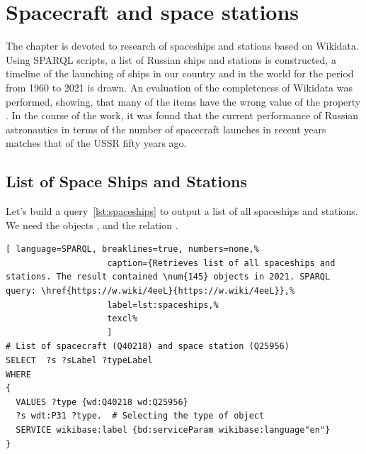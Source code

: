 
\setchapterpreamble[u]{\margintoc}
\chapter{Spacecraft and space stations}

The chapter is devoted to research of spaceships and stations based on Wikidata. 
Using SPARQL scripts, a list of Russian ships and stations is constructed, 
a timeline of the launching of ships in our country and in the world for the period from 1960 to 2021 is drawn. 
An evaluation of the completeness of Wikidata was performed, showing, 
that many of the items have the wrong value of the property 
. In the course of the work, it was found that the current performance of Russian astronautics in terms of the number of spacecraft launches in recent years matches that of the USSR fifty years ago. 

\section{List of Space Ships and Stations}
Let's build a query~\ref{lst:spaceships} to output a list of all spaceships and stations. 
We need the objects , 
 and the relation . 

\begin{lstlisting}[ language=SPARQL, breaklines=true, numbers=none,%
                    caption={Retrieves list of all spaceships and stations. The result contained \num{145} objects in 2021. SPARQL query: \href{https://w.wiki/4eeL}{https://w.wiki/4eeL}},%
                    label=lst:spaceships,%
                    texcl%
                    ]
# List of spacecraft (Q40218) and space station (Q25956)
SELECT  ?s ?sLabel ?typeLabel
WHERE
{
  VALUES ?type {wd:Q40218 wd:Q25956}
  ?s wdt:P31 ?type.  # Selecting the type of object
  SERVICE wikibase:label {bd:serviceParam wikibase:language"en"}
}
\end{lstlisting}%

